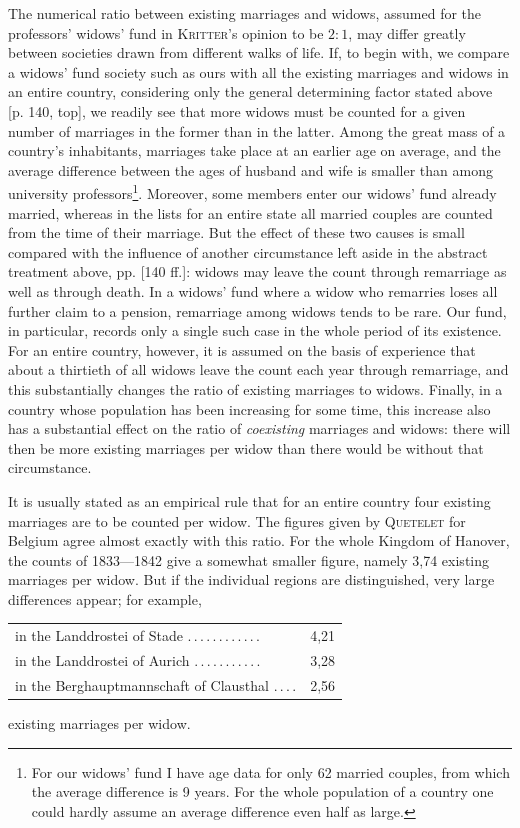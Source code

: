 The numerical ratio between existing marriages and widows, assumed for the professors' widows' fund in \textsc{Kritter}'s opinion to be \(2:1\), may differ greatly between societies drawn from different walks of life. If, to begin with, we compare a widows' fund society such as ours with all the existing marriages and widows in an entire country, considering only the general determining factor stated above [p. 140, top], we readily see that more widows must be counted for a given number of marriages in the former than in the latter. Among the great mass of a country's inhabitants, marriages take place at an earlier age on average, and the average difference between the ages of husband and wife is smaller than among university professors\footnote{For our widows' fund I have age data for only 62 married couples, from which the average difference is 9 years. For the whole population of a country one could hardly assume an average difference even half as large.}. Moreover, some members enter our widows' fund already married, whereas in the lists for an entire state all married couples are counted from the time of their marriage. But the effect of these two causes is small compared with the influence of another circumstance left aside in the abstract treatment above, pp. [140 ff.]: widows may leave the count through remarriage as well as through death. In a widows' fund where a widow who remarries loses all further claim to a pension, remarriage among widows tends to be rare. Our fund, in particular, records only a single such case in the whole period of its existence. For an entire country, however, it is assumed on the basis of experience that about a thirtieth of all widows leave the count each year through remarriage, and this substantially changes the ratio of existing marriages to widows. Finally, in a country whose population has been increasing for some time, this increase also has a substantial effect on the ratio of \textit{coexisting} marriages and widows: there will then be more existing marriages per widow than there would be without that circumstance.

It is usually stated as an empirical rule that for an entire country four existing marriages are to be counted per widow. The figures given by \textsc{Quetelet} for Belgium agree almost exactly with this ratio. For the whole Kingdom of Hanover, the counts of 1833—1842 give a somewhat smaller figure, namely 3,74 existing marriages per widow. But if the individual regions are distinguished, very large differences appear; for example,
\begin{center}
\begin{tabular}{l@{\;}r}
in the Landdrostei of Stade .\,.\,.\,.\,.\,.\,.\,.\,.\,.\,.\,. & 4,21\\
in the Landdrostei of Aurich .\,.\,.\,.\,.\,.\,.\,.\,.\,.\,. & 3,28\\
in the Berghauptmannschaft of Clausthal .\,.\,.\,. & 2,56
\end{tabular}
\end{center}
\noindent existing marriages per widow.


